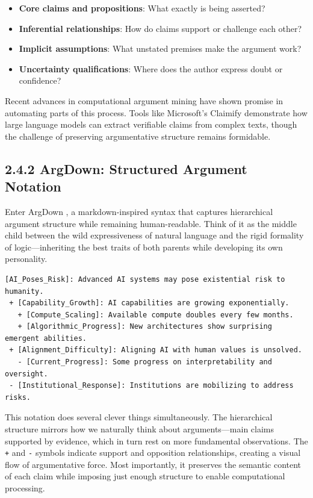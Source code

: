 \documentclass[
  11pt,
  letterpaper,
]{book}
\providecommand{\tightlist}{%
  \setlength{\itemsep}{0pt}\setlength{\parskip}{0pt}}
\begin{document}
\begin{itemize}
\tightlist
\item
  \textbf{Core claims and propositions}: What exactly is being asserted?
\item
  \textbf{Inferential relationships}: How do claims support or challenge
  each other?
\item
  \textbf{Implicit assumptions}: What unstated premises make the
  argument work?
\item
  \textbf{Uncertainty qualifications}: Where does the author express
  doubt or confidence?
\end{itemize}

Recent advances in computational argument mining \textcite{anderson2007}
\textcite{benn2011} \textcite{khartabil2021} have shown promise in
automating parts of this process. Tools like Microsoft's Claimify
\textcite{metropolitansky2025} demonstrate how large language models can
extract verifiable claims from complex texts, though the challenge of
preserving argumentative structure remains formidable.

\subsection{2.4.2 ArgDown: Structured Argument
Notation}\label{sec-argdown-notation}

Enter ArgDown \textcite{voigt2025}, a markdown-inspired syntax that
captures hierarchical argument structure while remaining human-readable.
Think of it as the middle child between the wild expressiveness of
natural language and the rigid formality of logic---inheriting the best
traits of both parents while developing its own personality.

\begin{verbatim}
[AI_Poses_Risk]: Advanced AI systems may pose existential risk to humanity.
 + [Capability_Growth]: AI capabilities are growing exponentially.
   + [Compute_Scaling]: Available compute doubles every few months.
   + [Algorithmic_Progress]: New architectures show surprising emergent abilities.
 + [Alignment_Difficulty]: Aligning AI with human values is unsolved.
   - [Current_Progress]: Some progress on interpretability and oversight.
 - [Institutional_Response]: Institutions are mobilizing to address risks.
\end{verbatim}

This notation does several clever things simultaneously. The
hierarchical structure mirrors how we naturally think about
arguments---main claims supported by evidence, which in turn rest on
more fundamental observations. The \texttt{+} and \texttt{-} symbols
indicate support and opposition relationships, creating a visual flow of
argumentative force. Most importantly, it preserves the semantic content
of each claim while imposing just enough structure to enable
computational processing.
\end{document}
